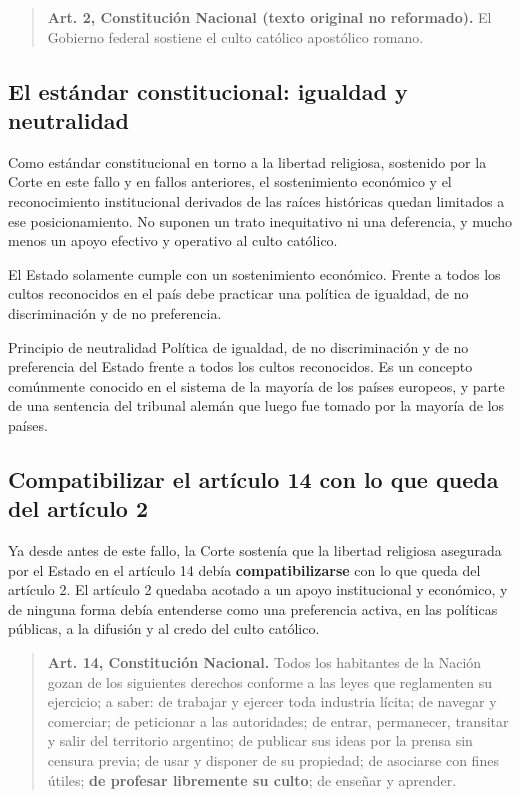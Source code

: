 \documentclass[12pt,oneside]{book}
\begin{document}
\begin{quote}
\textbf{Art. 2, Constitución Nacional (texto original no reformado).} El Gobierno federal sostiene el culto católico apostólico romano.
\end{quote}

\subsection{El estándar constitucional: igualdad y neutralidad}

Como estándar constitucional en torno a la libertad religiosa, sostenido por la Corte en este fallo y en fallos anteriores, el sostenimiento económico y el reconocimiento institucional derivados de las raíces históricas quedan limitados a ese posicionamiento. No suponen un trato inequitativo ni una deferencia, y mucho menos un apoyo efectivo y operativo al culto católico.

El Estado solamente cumple con un sostenimiento económico. Frente a todos los cultos reconocidos en el país debe practicar una política de igualdad, de no discriminación y de no preferencia.

\begin{definition}{Principio de neutralidad}
Política de igualdad, de no discriminación y de no preferencia del Estado frente a todos los cultos reconocidos. Es un concepto comúnmente conocido en el sistema de la mayoría de los países europeos, y parte de una sentencia del tribunal alemán que luego fue tomado por la mayoría de los países.
\end{definition}

\subsection{Compatibilizar el artículo 14 con lo que queda del artículo 2}

Ya desde antes de este fallo, la Corte sostenía que la libertad religiosa asegurada por el Estado en el artículo 14 debía \textbf{compatibilizarse} con lo que queda del artículo 2. El artículo 2 quedaba acotado a un apoyo institucional y económico, y de ninguna forma debía entenderse como una preferencia activa, en las políticas públicas, a la difusión y al credo del culto católico.

\begin{quote}
\textbf{Art. 14, Constitución Nacional.} Todos los habitantes de la Nación gozan de los siguientes derechos conforme a las leyes que reglamenten su ejercicio; a saber: de trabajar y ejercer toda industria lícita; de navegar y comerciar; de peticionar a las autoridades; de entrar, permanecer, transitar y salir del territorio argentino; de publicar sus ideas por la prensa sin censura previa; de usar y disponer de su propiedad; de asociarse con fines útiles; \textbf{de profesar libremente su culto}; de enseñar y aprender.
\end{quote}
\end{document}
